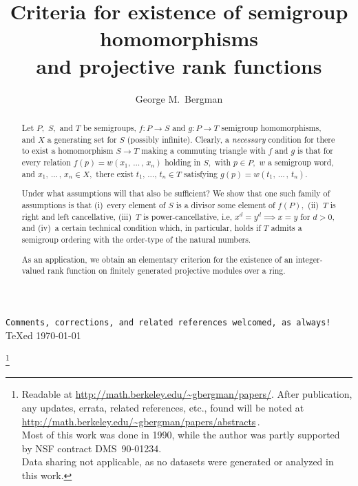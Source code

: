 \documentclass{amsart}
\numberwithin{equation}{section}
\numberwithin{theorem}{section}
\newcommand{\2}{\mathbf{2}}
\begin{document}
\begin{center}
\texttt{Comments, corrections,
and related references welcomed, as always!}\\[.5em]
{\TeX}ed \today
\\[.5em]
\vspace{2em}
\end{center}

\title%
[Semigroup homomorphisms and projective rank functions]%
{Criteria for existence of semigroup homomorphisms\\
and projective rank functions}
\thanks{%
Readable at \url{http://math.berkeley.edu/~gbergman/papers/}.
After publication, any updates, errata, related references,
etc., found will be noted at
\url{http://math.berkeley.edu/~gbergman/papers/abstracts}\,.\\
\hspace*{1.5em}Most of this work was done in 1990, while the author
was partly supported by NSF contract DMS\ 90-01234.\\
\hspace*{1.5em}Data sharing not applicable, as no datasets were
generated or analyzed in this work.}


\author{George M.\ Bergman}
\address{Department of Mathematics\\
University of California\\
Berkeley, CA 94720-3840, USA}

\begin{abstract}
Let $P,$ $S,$ and $T$ be semigroups, $f:P\to S$ and
$g:P\to T$ semigroup homomorphisms, and $X$ a generating set for $S$
(possibly infinite).
Clearly, a {\em necessary} condition for there to
exist a homomorphism $S\to T$ making
a commuting triangle with $f$ and $g$ is that for
every relation $f(p) = w(x_1,\,\dots\,,\,x_n)$ holding in $S,$ with
$p\in P,$ $w$ a semigroup word, and $x_1,\,\dots\,,\,x_n \in X,$
there exist $t_1,\,\dots,\,t_n\in T$
satisfying $g(p) = w(t_1,\,\dots\,,\,t_n).$

Under what assumptions will that also be sufficient?
We show that one such family of assumptions is that
(i)~every element of $S$ is a divisor some element of $f(P),$
(ii)~$T$ is right and left cancellative,
(iii)~$T$ is power-cancellative, i.e,
$x^d = y^d \implies x = y$ for $d > 0,$ and
(iv)~a certain technical condition which, in
particular, holds if $T$ admits a semigroup
ordering with the order-type of the natural numbers.

As an application, we obtain an elementary criterion for the
existence of an integer-valued rank function on
finitely generated projective modules over a ring.
\end{abstract}
\maketitle
\end{document}
